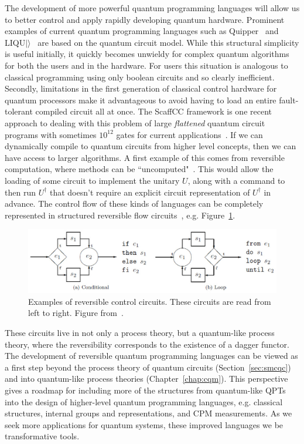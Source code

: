 The development of more powerful quantum programming languages will allow us to better control and apply rapidly developing quantum hardware. Prominent examples of current quantum programming languages such as Quipper~\cite{green2013quipper} and LIQU$|\rangle$~\cite{wecker2014liqui} are based on the quantum circuit model. While this structural simplicity is useful initially, it quickly becomes unwieldy for complex quantum algorithms for both the users and in the hardware. For users this situation is analogous to classical programming using only boolean circuits and so clearly inefficient. Secondly, limitations in the first generation of classical control hardware for quantum processors make it advantageous to avoid having to load an entire fault-tolerant compiled circuit all at once. The ScaffCC framework is one recent approach to dealing with this problem of large \textit{flattened} quantum circuit programs with sometimes $10^{12}$ gates for current applications~\cite{javadiabhari2014scaffcc}.  If we can dynamically compile to quantum circuits from higher level concepts, then we can have access to larger algorithms. A first example of this comes from reversible computation, where methods can be ``uncomputed"~\cite{yokoyama2008principles}. This would allow the loading of some circuit to implement the unitary $U$, along with a command to then run $U^{\dagger}$ that doesn't require an explicit circuit representation of $U^{\dagger}$ in advance. The control flow of these kinds of languages can be completely represented in structured reversible flow circuits~\cite{yokoyama2008reversible}, e.g. Figure~\ref{fig:reversible}.

\begin{figure}[t]
\centering
\includegraphics[scale=0.45]{figures/reversible.eps}
\caption[Example of reversible control circuits.]{Examples of reversible control circuits.  These circuits are read from left to right.  Figure from~\cite{yokoyama2010reversible}.}
\label{fig:reversible}
\end{figure}

These circuits live in not only a process theory, but a quantum-like process theory, where the reversibility corresponds to the existence of a dagger functor. The development of reversible quantum programming languages can be viewed as a first step beyond the process theory of quantum circuits (Section~\ref{sec:smcqc}) and into quantum-like process theories (Chapter~\ref{chap:cqm}). This perspective gives a roadmap for including more of the structures from quantum-like QPTs into the design of higher-level quantum programming languages, e.g. classical structures, internal groups and representations, and CPM measurements. As we seek more applications for quantum systems, these improved languages we be transformative tools.
